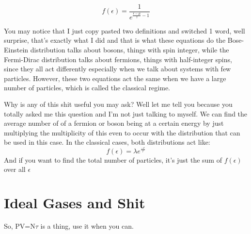 \documentclass[arial]{article}
\begin{document}
\begin{equation}
f(\epsilon)=\frac{1}{e^{\frac{\epsilon-\mu}{\tau}-1}}
\end{equation}

You may notice that I just copy pasted two definitions and switched 1 word, well surprise, that's exactly what I did and that is what these equations do the Bose-Einstein distribution talks about bosons, things with spin integer, while the Fermi-Dirac distribution talks about fermions, things with half-integer spins, since they all act differently especially when we talk about systems with few particles. However, these two equations act the same when we have a large number of particles, which is called the classical regime.
\vspace{3mm}

Why is any of this shit useful you may ask? Well let me tell you because you totally asked me this question and I'm not just talking to myself. We can find the average number of of a fermion or boson being at a certain energy by just multiplying the multiplicity of this even to occur with the distribution that can be used in this case. In the classical cases, both distributions act like:
\begin{equation}
f(\epsilon)=\lambda e^\frac{-\epsilon}{\tau}
\end{equation}
And if you want to find the total number of particles, it's just the sum of $f(\epsilon)$ over all $\epsilon$

\section*{Ideal Gases and Shit}
So, PV=N$\tau$ is a thing, use it when you can.
\end{document}
